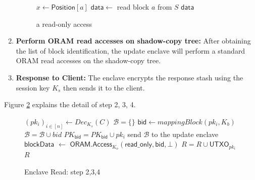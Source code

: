 \begin{enumerate}
	\begin{figure}[t]\label{fig:oram-read-only-access}
	\centering
	\begin{minipage}{\linewidth}
	\begin{algorithm}[H]
	  	\caption{$\mathsf{ORAM.Access}_{K_o}\mathsf{(read\_only,a,\bot})$\label{alg}}
	  	\begin{algorithmic}[1]
			\State $x \leftarrow \mathsf{Position}[a]$
			\EndFor
			\State $\mathsf{data}\leftarrow$ read block $a$ from $S$
			\State \Return $\mathsf{data}$
		\end{algorithmic}	
	\end{algorithm}
	\end{minipage}
	\caption{a read-only access}
	\end{figure}
	\item \textbf{Perform ORAM read accesses on shadow-copy tree:} After obtaining the list of block identification,  the update enclave will perform a standard ORAM read accesses on the shadow-copy tree. 
	\item \textbf{Response to Client: } The enclave encrypts the response stash using the session key $K_s$ then sends it to the client.
\end{enumerate}

Figure \ref{fig:oread} explains the detail of step 2, 3, 4.
\begin{figure}[H]
\centering
\begin{minipage}{\linewidth}
\begin{algorithm}[H]
  	\caption{$\mathsf{ObliviousRead}(C, K_o, K_b, K_s)$\label{alg}}
  	\begin{algorithmic}[1]
		\State $(pk_i)_{i\in [n]} \leftarrow Dec_{K_s}(C)$
		\State $\mathcal B = \{\}$ 
		\State $\mathsf{bid} \leftarrow mappingBlock(pk_i,K_b)$
		\State $\mathcal B = \mathcal B \cup bid$
		\State $PK_{\mathsf{bid}} = PK_{\mathsf{bid}} \cup pk_i$
		\EndFor
		\State send $\mathcal B$ to the update enclave
		\State $\mathsf{blockData}$ $\leftarrow$ $\mathsf{{ORAM.Access}}_{K_o}(\mathsf{read\_only, bid,} \bot)$
			\State $R = R \cup \mathsf{UTXO}_{pk_i}$
			\EndIf
			\EndFor
		\EndFor
		\State \Return $R$
	\end{algorithmic}	
\end{algorithm}
\end{minipage}
\caption{Enclave Read: step 2,3,4}
\label{fig:oread}
\end{figure}
